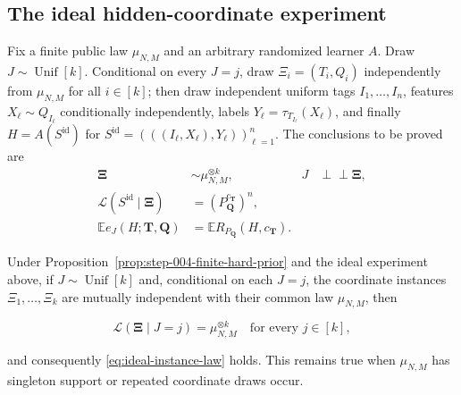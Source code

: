 \subsection{The ideal hidden-coordinate experiment}\label{app:step-008}
Fix a finite public law $\mu_{N,M}$ and an arbitrary randomized learner
$A$.  Draw $J\sim\operatorname{Unif}[k]$.  Conditional on every $J=j$,
draw $\Xi_i=(T_i,Q_i)$ independently from $\mu_{N,M}$ for all $i\in[k]$;
then draw independent uniform tags $I_1,\ldots,I_n$, features
$X_\ell\sim Q_{I_\ell}$ conditionally independently, labels
$Y_\ell=\tau_{T_{I_\ell}}(X_\ell)$, and finally
$H=A(S^{\mathrm{id}})$ for
$S^{\mathrm{id}}=(((I_\ell,X_\ell),Y_\ell))_{\ell=1}^n$.
The conclusions to be proved are
\begin{align}
\boldsymbol\Xi&\sim\mu_{N,M}^{\otimes k},
&J&\perp\!\!\!\perp\boldsymbol\Xi,
\tag{S8.2}\label{eq:ideal-instance-law}\\
\mathcal L(S^{\mathrm{id}}\mid\boldsymbol\Xi)
&=(P_{\boldsymbol Q}^{c_{\boldsymbol T}})^n,
\tag{S8.3}\label{eq:ideal-sample-law}\\
\mathbb E e_J(H;\boldsymbol T,\boldsymbol Q)
&=\mathbb E R_{P_{\boldsymbol Q}}(H,c_{\boldsymbol T}).
\tag{S8.4}\label{eq:ideal-risk-identity}
\end{align}
\begin{lemma}\label{lem:step-008-instance-factorization}
Under Proposition~\ref{prop:step-004-finite-hard-prior} and the
ideal experiment above, if \(J\sim\operatorname{Unif}[k]\) and, conditional
on each \(J=j\), the coordinate instances
\(\Xi_1,\ldots,\Xi_k\) are mutually independent with their common law
\(\mu_{N,M}\), then

\[
\mathcal L(\boldsymbol\Xi\mid J=j)=\mu_{N,M}^{\otimes k}
\quad\text{for every }j\in[k],
\tag{S8.5}\label{eq:step-008-5}
\]

and consequently \eqref{eq:ideal-instance-law} holds. This remains true when \(\mu_{N,M}\) has
singleton support or repeated coordinate draws occur.
\end{lemma}

